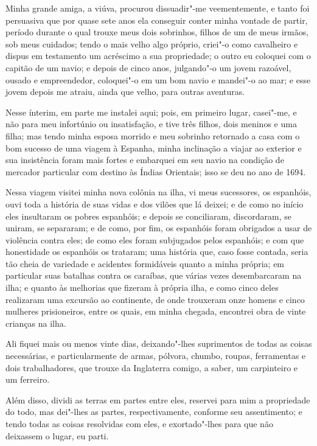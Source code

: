 Minha grande amiga, a viúva, procurou dissuadir"-me veementemente, e
tanto foi persuasiva que por quase sete anos ela conseguir conter minha
vontade de partir, período durante o qual trouxe meus dois sobrinhos,
filhos de um de meus irmãos, sob meus cuidados; tendo o mais velho algo
próprio, criei"-o como cavalheiro e dispus em testamento um acréscimo a
sua propriedade; o outro eu coloquei com o capitão de um navio; e depois
de cinco anos, julgando"-o um jovem razoável, ousado e empreendedor,
coloquei"-o em um bom navio e mandei"-o ao mar; e esse jovem depois me
atraiu, ainda que velho, para outras aventuras.

Nesse ínterim, em parte me instalei aqui; pois, em primeiro lugar,
casei"-me, e não para meu infortúnio ou insatisfação, e tive três filhos,
dois meninos e uma filha; mas tendo minha esposa morrido e meu sobrinho
retornado a casa com o bom sucesso de uma viagem à Espanha, minha
inclinação a viajar ao exterior e sua insistência foram mais fortes e
embarquei em seu navio na condição de mercador particular com destino às
Índias Orientais; isso se deu no ano de 1694.

Nessa viagem visitei minha nova colônia na ilha, vi meus sucessores, os
espanhóis, ouvi toda a história de suas vidas e dos vilões que lá
deixei; e de como no início eles insultaram os pobres espanhóis; e
depois se conciliaram, discordaram, se uniram, se separaram; e de como,
por fim, os espanhóis foram obrigados a usar de violência contra eles;
de como eles foram subjugados pelos espanhóis; e com que honestidade os
espanhóis os trataram; uma história que, caso fosse contada, seria tão
cheia de variedade e acidentes formidáveis quanto a minha própria; em
particular suas batalhas contra os caraíbas, que várias vezes
desembarcaram na ilha; e quanto às melhorias que fizeram à própria ilha,
e como cinco deles realizaram uma excursão ao continente, de onde
trouxeram onze homens e cinco mulheres prisioneiros, entre os quais, em
minha chegada, encontrei obra de vinte crianças na ilha.

Ali fiquei mais ou menos vinte dias, deixando"-lhes suprimentos de todas
as coisas necessárias, e particularmente de armas, pólvora, chumbo,
roupas, ferramentas e dois trabalhadores, que trouxe da Inglaterra
comigo, a saber, um carpinteiro e um ferreiro.

Além disso, dividi as terras em partes entre eles, reservei para mim a
propriedade do todo, mas dei"-lhes as partes, respectivamente, conforme
seu assentimento; e tendo todas as coisas resolvidas com eles, e
exortado"-lhes para que não deixassem o lugar, eu parti.

